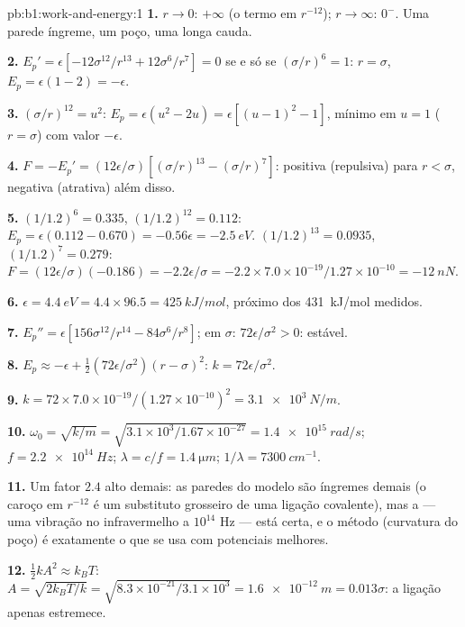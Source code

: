 \begin{solution}{pb:b1:work-and-energy:1}
\textbf{1.} $r \to 0$: $+\infty$ (o termo em $r^{-12}$); $r \to \infty$:
$0^-$. Uma parede íngreme, um poço, uma longa cauda.

\textbf{2.} $E_p' = \epsilon[-12\sigma^{12}/r^{13} + 12\sigma^6/r^7] = 0$ se e só se
$(\sigma/r)^6 = 1$: $r = \sigma$, $E_p = \epsilon(1 - 2) = -\epsilon$.

\textbf{3.} $(\sigma/r)^{12} = u^2$: $E_p = \epsilon(u^2 - 2u) = \epsilon[(u - 1)^2
- 1]$, mínimo em $u = 1$ ($r = \sigma$) com valor $-\epsilon$.

\textbf{4.} $F = -E_p' = (12\epsilon/\sigma)[(\sigma/r)^{13} - (\sigma/r)^7]$:
positiva (repulsiva) para $r < \sigma$, negativa (atrativa) além disso.

\textbf{5.} $(1/1.2)^6 = 0.335$, $(1/1.2)^{12} = 0.112$: $E_p = \epsilon(0.112
- 0.670) = -0.56\epsilon = \qty{-2.5}{eV}$. $(1/1.2)^{13} = 0.0935$,
$(1/1.2)^7 = 0.279$: $F = (12\epsilon/\sigma)(-0.186) = -2.2\epsilon/\sigma =
-2.2 \times 7.0\times10^{-19}/1.27\times10^{-10} = \qty{-12}{nN}$.

\textbf{6.} $\epsilon = \qty{4.4}{eV} = 4.4 \times 96.5 = \qty{425}{kJ/mol}$,
próximo dos \qty{431}{kJ/mol} medidos.

\textbf{7.} $E_p'' = \epsilon[156\sigma^{12}/r^{14} - 84\sigma^6/r^8]$; em
$\sigma$: $72\epsilon/\sigma^2 > 0$: estável.

\textbf{8.} $E_p \approx -\epsilon + \tfrac12(72\epsilon/\sigma^2)(r - \sigma)^2$:
$k = 72\epsilon/\sigma^2$.

\textbf{9.} $k = 72 \times 7.0\times10^{-19}/(1.27\times10^{-10})^2 =
\qty{3.1e3}{N/m}$.

\textbf{10.} $\omega_0 = \sqrt{k/m} = \sqrt{3.1\times10^3/1.67\times10^{-27}} =
\qty{1.4e15}{rad/s}$; $f = \qty{2.2e14}{Hz}$; $\lambda = c/f = \qty{1.4}{\micro m}$;
$1/\lambda = \qty{7300}{cm^{-1}}$.

\textbf{11.} Um fator $2.4$ alto demais: as paredes do modelo são íngremes demais
(o caroço em $r^{-12}$ é um substituto grosseiro de uma ligação covalente), mas a
 --- uma vibração no infravermelho a $10^{14}$ Hz --- está
certa, e o método (curvatura do poço) é exatamente o que se usa
com potenciais melhores.

\textbf{12.} $\tfrac12 kA^2 \approx k_BT$: $A = \sqrt{2k_BT/k} = \sqrt{8.3\times
10^{-21}/3.1\times10^3} = \qty{1.6e-12}{m} = 0.013\sigma$: a ligação
apenas estremece.


\end{solution}
